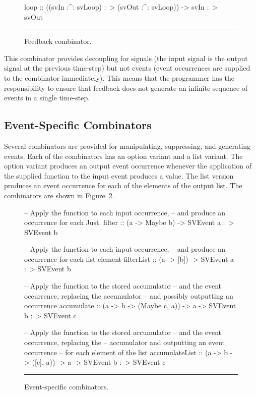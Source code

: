 \begin{figure}
\begin{code}
loop ::    ((svIn :^: svLoop) :~> (svOut :^: svLoop))
        -> svIn :~> svOut
\end{code}
\hrule
\caption{Feedback combinator.}
\label{figure:feedback_combinator}
\end{figure}

This combinator provides decoupling for signals
(the input signal is the output signal at the previous time-step)
but not events (event occurrences are supplied to the combinator immediately).
This means that the programmer has the responsibility to ensure that feedback
does not generate an infinite sequence of events in a single time-step.

\subsection{Event-Specific Combinators}
\label{subsection:System_Design_and_Interface-Combinators-Event_specific_combinators}

Several combinators are provided for manipulating, suppressing, and generating events.
Each of the combinators has an option variant and a list variant. The option variant
produces an output event occurrence whenever the application of the supplied function
to the input event produces a value. The list version produces an event occurrence for
each of the elements of the output list. The combinators are shown in Figure~\ref{figure:event_specific_combinators}.

\begin{figure}
\begin{code}
-- Apply the function to each input occurrence,
-- and produce an occurrence for each Just.
filter :: (a -> Maybe b) -> SVEvent a :~> SVEvent b

-- Apply the function to each input occurrence,
-- and produce an occurrence for each list element
filterList :: (a -> [b]) -> SVEvent a :~> SVEvent b

-- Apply the function to the stored accumulator
-- and the event occurrence, replacing the accumulator
-- and possibly outputting an occurrence
accumulate ::    (a -> b -> (Maybe c, a))
              -> a
              -> SVEvent b :~> SVEvent c

-- Apply the function to the stored accumulator
-- and the event occurrence, replacing the
-- accumulator and outputting an event occurrence
-- for each element of the list
accumulateList ::    (a -> b -> ([c], a))
                  -> a
                  -> SVEvent b :~> SVEvent c
\end{code}
\hrule
\caption{Event-specific combinators.}
\label{figure:event_specific_combinators}
\end{figure}

